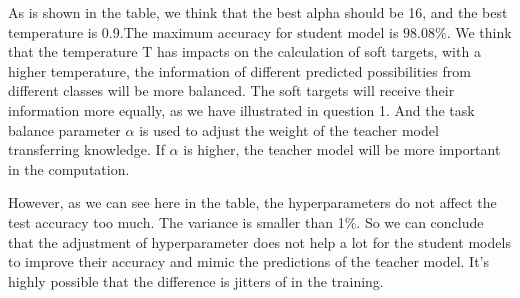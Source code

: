 \documentclass[conference]{IEEEtran}
\begin{document}
  As is shown in the table, we think that the best alpha should be 16, and the best temperature is 0.9.The maximum accuracy for student model is $98.08\%$. 
We think that the temperature T has impacts on the calculation of soft targets, with a higher temperature, the information of different predicted possibilities from different classes will be more balanced. The soft targets will receive their information more equally, as we have illustrated in question 1. And the task balance parameter $\alpha$ is used to adjust the weight of the teacher model transferring knowledge. If $\alpha$ is higher, the teacher model will be more important in the computation.\par
However, as we can see here in the table, the hyperparameters do not affect the test accuracy too much. The variance is smaller than 1\%. So we can conclude that the adjustment of hyperparameter does not help a lot for the student models to improve their accuracy and mimic the predictions of the teacher model. It's highly possible that the difference is jitters of in the training.
\end{document}
